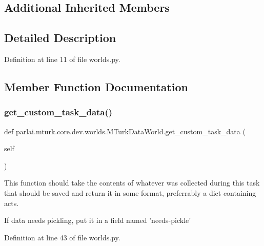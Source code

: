 \subsection*{Additional Inherited Members}


\subsection{Detailed Description}


Definition at line 11 of file worlds.\+py.



\subsection{Member Function Documentation}
\mbox{\label{classparlai_1_1mturk_1_1core_1_1dev_1_1worlds_1_1MTurkDataWorld_af01360aeaa7e6ad524049621551683df}} 
\subsubsection{\texorpdfstring{get\+\_\+custom\+\_\+task\+\_\+data()}{get\_custom\_task\_data()}}
{\footnotesize\ttfamily def parlai.\+mturk.\+core.\+dev.\+worlds.\+M\+Turk\+Data\+World.\+get\+\_\+custom\+\_\+task\+\_\+data (\begin{DoxyParamCaption}\item[{}]{self }\end{DoxyParamCaption})}

\begin{DoxyVerb}This function should take the contents of whatever was collected during this
task that should be saved and return it in some format, preferrably a dict
containing acts.

If data needs pickling, put it in a field named 'needs-pickle'
\end{DoxyVerb}
 

Definition at line 43 of file worlds.\+py.


